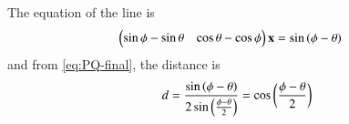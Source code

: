 The equation of the line is
\begin{align}
\begin{pmatrix}\sin\phi-\sin\theta&\cos\theta-\cos\phi\end{pmatrix}\mathbf{x}&=\sin\left(\phi-\theta\right)
\label{eq:chapters/11/10/4/5/1}
\end{align}
and from 
			\eqref{eq:PQ-final},
the distance is
\begin{align}
d
=\frac{\sin\left(\phi-\theta\right)}{2\sin\left(\frac{\phi-\theta}{2}\right)} = \cos\left(\frac{\phi-\theta}{2}\right)
\label{eq:chapters/11/10/4/5/2}
\end{align}
